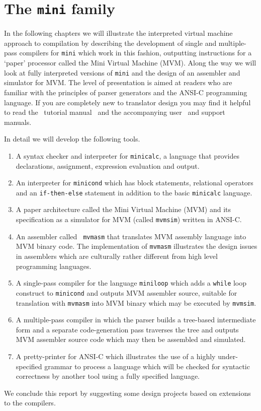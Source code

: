 \section{The {\tt mini} family} In the following chapters we will
illustrate the interpreted virtual machine approach to compilation by
describing the development of single and multiple-pass compilers for
{\tt mini} which work in this fashion, outputting instructions for a
`paper' processor called the Mini Virtual Machine (MVM). Along the way
we will look at fully interpreted versions of {\tt mini} and the design
of an assembler and simulator for MVM.  The level of presentation is
aimed at readers who are familiar with the principles of parser
generators and the ANSI-C programming language. If you are completely
new to translator design you may find it helpful to read the 
\rdp\ tutorial manual~\cite{rdp:tut:1.5} and the accompanying
user~\cite{rdp:user:1.5} and support~\cite{rdp:supp:1.5} manuals.

In detail we will develop the following tools. \begin{enumerate} \item A
syntax checker and interpreter for {\tt minicalc}, a language that
provides declarations, assignment, expression evaluation and output.
\item An interpreter for {\tt minicond} which has block statements,
relational operators and an {\tt if-then-else} statement 
in addition to the
basic {\tt minicalc} language. \item A paper architecture called the
Mini Virtual Machine (MVM) and its specification as a simulator for MVM
(called {\tt mvmsim}) written in ANSI-C. \item An assembler called {\tt
mvmasm} that translates MVM assembly language into MVM binary code. The
implementation of {\tt mvmasm} illustrates the design issues in
assemblers which are culturally rather different from high level
programming languages. \item A single-pass compiler for the language {\tt miniloop}
which adds a {\tt while} loop construct to {\tt minicond} and outputs MVM
assembler source, suitable for translation with {\tt mvmasm} into MVM
binary which may be executed by {\tt mvmsim}.
\item A multiple-pass compiler in which the parser builds a tree-based intermediate
form and a separate code-generation pass traverses the tree and outputs MVM assembler
source code which may then be assembled and simulated.
\item A pretty-printer for ANSI-C which illustrates the use of a highly under-specified
grammar to process a language which will be checked for syntactic correctness by
another tool using a fully specified language.
\end{enumerate}
We conclude this report by suggesting some design projects based on
extensions to the compilers.

